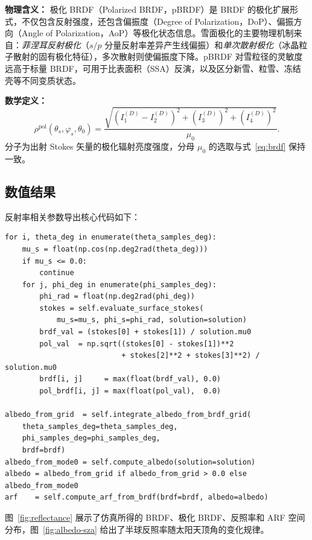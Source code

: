 \documentclass[UTF8,a4paper,12pt]{ctexart}
\begin{document}
\textbf{物理含义：}
极化 BRDF（Polarized BRDF，pBRDF）是 BRDF 的极化扩展形式，不仅包含反射强度，还包含偏振度（Degree of Polarization，DoP）、偏振方向（Angle of Polarization，AoP）等极化状态信息。雪面极化的主要物理机制来自：\textit{菲涅耳反射极化}（$s/p$ 分量反射率差异产生线偏振）和\textit{单次散射极化}（冰晶粒子散射的固有极化特征），多次散射则使偏振度下降。pBRDF 对雪粒径的灵敏度远高于标量 BRDF，可用于比表面积（SSA）反演，以及区分新雪、粒雪、冻结壳等不同变质状态。

\textbf{数学定义：}
\begin{equation}
  \rho^{\mathrm{pol}}(\theta_s,\varphi_s,\theta_0)
  = \frac{\sqrt{(I_1^{(D)}-I_2^{(D)})^2+(I_3^{(D)})^2+(I_4^{(D)})^2}}{\mu_0}.
  \label{eq:pol-brdf}
\end{equation}
分子为出射 Stokes 矢量的极化辐射亮度强度，分母 $\mu_0$ 的选取与式~\eqref{eq:brdf} 保持一致。

\subsection{数值结果}

反射率相关参数导出核心代码如下：

\begin{lstlisting}[caption={BRDF/极化BRDF/Albedo/ARF 导出核心（radiative\_transfer\_solver.py）},label={lst:reflectance-export}]
for i, theta_deg in enumerate(theta_samples_deg):
    mu_s = float(np.cos(np.deg2rad(theta_deg)))
    if mu_s <= 0.0:
        continue
    for j, phi_deg in enumerate(phi_samples_deg):
        phi_rad = float(np.deg2rad(phi_deg))
        stokes = self.evaluate_surface_stokes(
            mu_s=mu_s, phi_s=phi_rad, solution=solution)
        brdf_val = (stokes[0] + stokes[1]) / solution.mu0
        pol_val  = np.sqrt((stokes[0] - stokes[1])**2
                           + stokes[2]**2 + stokes[3]**2) / solution.mu0
        brdf[i, j]     = max(float(brdf_val), 0.0)
        pol_brdf[i, j] = max(float(pol_val),  0.0)

albedo_from_grid  = self.integrate_albedo_from_brdf_grid(
    theta_samples_deg=theta_samples_deg,
    phi_samples_deg=phi_samples_deg,
    brdf=brdf)
albedo_from_mode0 = self.compute_albedo(solution=solution)
albedo = albedo_from_grid if albedo_from_grid > 0.0 else albedo_from_mode0
arf    = self.compute_arf_from_brdf(brdf=brdf, albedo=albedo)
\end{lstlisting}

图~\ref{fig:reflectance} 展示了仿真所得的 BRDF、极化 BRDF、反照率和 ARF 空间分布，图~\ref{fig:albedo-sza} 给出了半球反照率随太阳天顶角的变化规律。
\end{document}
